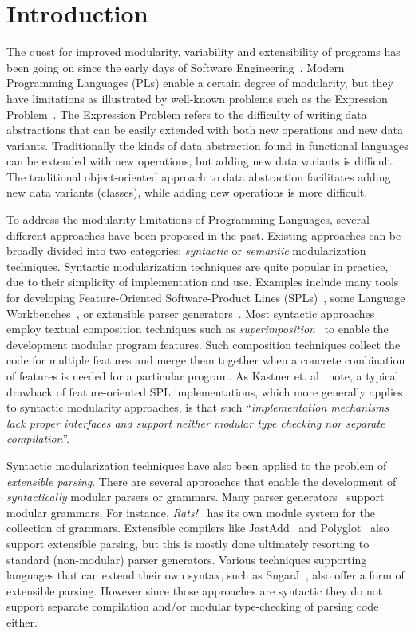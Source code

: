 \section{Introduction}\label{sec:introduction}

The quest for improved modularity, variability and extensibility of
programs has been going on since the early days of Software
Engineering~\cite{McIlroy68}. Modern Programming Languages (PLs) enable a certain
degree of modularity, but they have limitations as illustrated by
well-known problems such as the Expression Problem~\cite{wadler1998expression}. The
Expression Problem refers to the difficulty of writing data
abstractions that can be easily extended with both new operations and
new data variants. Traditionally the kinds of data abstraction found
in functional languages can be extended with new operations, but
adding new data variants is difficult. The traditional object-oriented
approach to data abstraction facilitates adding new data variants
(classes), while adding new operations is more difficult.

To address the modularity limitations of Programming Languages, several
different approaches have been proposed in the past. Existing
approaches can be broadly divided into two categories:
\emph{syntactic} or \emph{semantic} modularization
techniques. Syntactic modularization techniques are quite popular in
practice, due to their simplicity of implementation and use.
Examples include many tools for developing Feature-Oriented Software-Product
Lines (SPLs)~\cite{AK:JOT09,Kastner11road}, some Language Workbenches~\cite{Erdweg201524}, or extensible parser
generators~\cite{antlr1995,Grimm2006,Gouseti2014,Warth2016}.  Most syntactic approaches employ textual
composition techniques such as \emph{superimposition}~\cite{AK:JOT09} to
enable the development modular program features. Such
composition techniques collect the code for multiple features and
merge them together when a concrete combination of features is needed
for a particular program. As Kastner et. al~\cite{Kastner11road} note,
a typical drawback of feature-oriented SPL implementations, which
more generally applies to syntactic modularity approaches, is that
such ``\emph{implementation mechanisms lack proper
  interfaces and support neither modular type checking nor separate
  compilation}''.

Syntactic modularization techniques have also been applied to the
problem of \emph{extensible parsing}. There are several approaches
that enable the development of \emph{syntactically} modular parsers or
grammars. Many parser
generators~\cite{antlr1995,Grimm2006,Gouseti2014,Warth2016} support
modular grammars. For instance, \textit{Rats!}~\cite{Grimm2006} has
its own module system for the collection of grammars.  Extensible
compilers like JastAdd~\cite{Ekman2007} and
Polyglot~\cite{Nystrom2003} also support extensible parsing, but this
is mostly done ultimately resorting to standard (non-modular) parser
generators. Various techniques supporting languages that can extend
their own syntax, such as SugarJ~\cite{Erdweg2011}, also offer a form
of extensible parsing. However since those approaches are syntactic
they do not support separate compilation and/or modular type-checking
of parsing code either.


